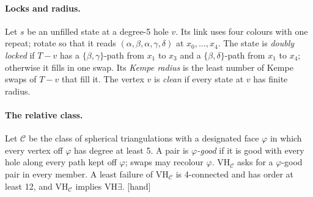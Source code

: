 \documentclass[11pt]{article}
\newcommand{\lab}[1]{\textsf{[#1]}}
\begin{document}
\paragraph{Locks and radius.} Let $s$ be an unfilled state at a degree-5 hole $v$. Its link uses four colours with one repeat; rotate so that it reads $(\alpha,\beta,\alpha,\gamma,\delta)$ at $x_0,\dots,x_4$. The state is \emph{doubly locked} if $T-v$ has a $\{\beta,\gamma\}$-path from $x_1$ to $x_3$ and a $\{\beta,\delta\}$-path from $x_1$ to $x_4$; otherwise it fills in one swap. Its \emph{Kempe radius} is the least number of Kempe swaps of $T-v$ that fill it. The vertex $v$ is \emph{clean} if every state at $v$ has finite radius.

\paragraph{The relative class.} Let $\mathcal C$ be the class of spherical triangulations with a designated face $\varphi$ in which every vertex off $\varphi$ has degree at least 5. A pair is \emph{$\varphi$-good} if it is good with every hole along every path kept off $\varphi$; swaps may recolour $\varphi$. $\mathrm{VH}_{\mathcal C}$ asks for a $\varphi$-good pair in every member. A least failure of $\mathrm{VH}_{\mathcal C}$ is 4-connected and has order at least 12, and $\mathrm{VH}_{\mathcal C}$ implies VH$\exists$. \lab{hand}
\end{document}
